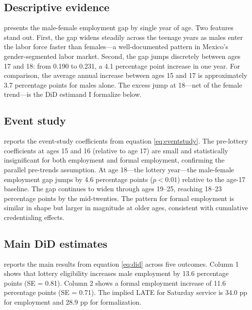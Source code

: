 \documentclass[12pt]{article}
\begin{document}
\subsection{Descriptive evidence}

 presents the male-female employment gap by single year of age. Two features stand out. First, the gap widens steadily across the teenage years as males enter the labor force faster than females---a well-documented pattern in Mexico's gender-segmented labor market. Second, the gap jumps discretely between ages 17 and 18: from 0.190 to 0.231, a 4.1 percentage point increase in one year. For comparison, the average annual increase between ages 15 and 17 is approximately 3.7 percentage points for males alone. The excess jump at 18---net of the female trend---is the DiD estimand I formalize below.



\subsection{Event study}

 reports the event-study coefficients from equation \eqref{eq:eventstudy}. The pre-lottery coefficients at ages 15 and 16 (relative to age 17) are small and statistically insignificant for both employment and formal employment, confirming the parallel pre-trends assumption. At age 18---the lottery year---the male-female employment gap jumps by 4.6 percentage points ($p < 0.01$) relative to the age-17 baseline. The gap continues to widen through ages 19--25, reaching 18--23 percentage points by the mid-twenties. The pattern for formal employment is similar in shape but larger in magnitude at older ages, consistent with cumulative credentialing effects.



\subsection{Main DiD estimates}

 reports the main results from equation \eqref{eq:did} across five outcomes. Column 1 shows that lottery eligibility increases male employment by 13.6 percentage points (SE = 0.81). Column 2 shows a formal employment increase of 11.6 percentage points (SE = 0.71). The implied LATE for Saturday service is 34.0 pp for employment and 28.9 pp for formalization.
\end{document}
